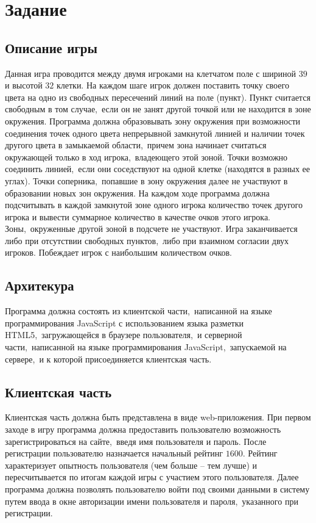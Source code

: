 \documentclass[14pt,a4paper]{report}
\makeatletter
\newif\if@prechapterused
\let\oldchapter\chapter
\renewcommand{\chapter}[1]
{
\if@prechapterused\vspace{-2em}\@prechapterusedfalse\fi
\begingroup
	\let\clearpage\relax
	\let\cleardoublepage\relax
	\oldchapter{#1}
\endgroup
}
\makeatother
\begin{document}
\chapter{Задание}

\section{Описание игры}
Данная игра проводится между двумя игроками на клетчатом поле с шириной $39$ и высотой $32$ клетки. На каждом шаге игрок должен поставить точку своего цвета на одно из свободных пересечений линий на поле (пункт). Пункт считается свободным в том случае,~если он не занят другой точкой или не находится в зоне окружения. Программа должна образовывать зону окружения при возможности  соединения точек одного цвета непрерывной замкнутой линией и наличии точек другого цвета в замыкаемой области,~причем зона начинает считаться окружающей только в ход игрока,~владеющего этой зоной. Точки возможно соединить линией,~если они соседствуют на одной клетке (находятся в разных ее углах). Точки соперника,~попавшие в зону окружения далее не участвуют в образовании новых зон окружения. На каждом ходе программа должна подсчитывать в каждой замкнутой зоне одного игрока количество точек другого игрока и вывести суммарное количество в качестве очков этого игрока. Зоны,~окруженные другой зоной в подсчете не участвуют. Игра заканчивается либо при отсутствии свободных пунктов,~либо при взаимном согласии двух игроков. Побеждает игрок с наибольшим количеством очков.

\section{Архитекура}
Программа должна состоять из клиентской части,~написанной на языке программирования JavaScript с использованием языка разметки HTML5,~загружающейся в браузере пользователя,~и серверной части,~написанной на языке программирования JavaScript,~запускаемой на сервере,~и к которой присоединяется клиентская часть.

\section{Клиентская часть}
Клиентская часть должна быть представлена в виде web-приложения. При первом заходе в игру программа должна предоставить пользователю возможность зарегистрироваться на сайте,~введя имя пользователя и пароль. После регистрации пользователю назначается начальный рейтинг $1600$. Рейтинг характеризует опытность пользователя (чем больше – тем лучше) и пересчитывается по итогам каждой игры с участием этого пользователя. Далее программа должна позволять пользователю войти под своими данными в систему путем ввода в окне авторизации имени пользователя и пароля,~указанного при регистрации.
\end{document}
